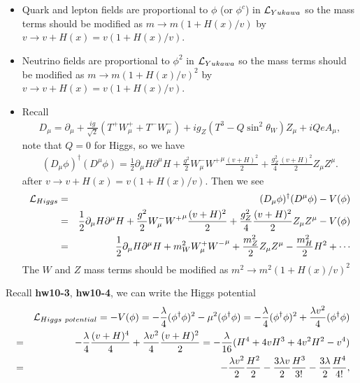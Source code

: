 \documentclass[11pt]{article}
\def\del{{\partial}}
\begin{document}
\section{ }
\begin{itemize}
    \item Quark and lepton fields are proportional to $\phi$ (or $\phi^c$) in ${\cal L}_{Yukawa}$ so the mass terms should be modified as $m\to m(1+H(x)/v)$ by $v \to v+H(x) = v(1+H(x)/v)$. 
    \item Neutrino fields are proportional to $\phi^2$ in ${\cal L}_{Yukawa}$ so the mass terms should be modified as $m\to m(1+H(x)/v)^2$ by $v \to v+H(x) = v(1+H(x)/v)$.
    \item Recall
    \begin{eqnarray}
        D_\mu = \del_\mu +\frac{ig}{\sqrt 2} (T^+ W_\mu^+ + T^-W_\mu^-)+ig_Z(T^3-Q\sin^2\theta_W)Z_\mu + iQeA_\mu,
    \end{eqnarray}
    note that $Q=0$ for Higgs, so we have
    \begin{eqnarray}
        (D_\mu \phi)^\dagger (D^\mu \phi) =  \frac{1}{ 2}\del_\mu H \del^\mu H + \frac{g^2}{2}W_\mu^-{W^+}^\mu \frac{(v+H)^2}{2}+\frac{g_Z^2}{4} \frac{(v+H)^2}{2} Z_\mu Z^\mu. 
    \end{eqnarray}
    after $v \to v+H(x) = v(1+H(x)/v)$.
    Then we see 
    \begin{eqnarray}
        {\cal L}_{Higgs} &=& (D_\mu \phi)^\dagger (D^\mu \phi) - V(\phi) \\ 
        &=& \frac{1}{2}\del_\mu H \del^\mu H + \frac{g^2}{2}W_\mu^-{W^+}^\mu \frac{(v+H)^2}{2}+\frac{g_Z^2}{4} \frac{(v+H)^2}{2} Z_\mu Z^\mu -V(\phi) \\
        &=& \frac{1}{2} \del_\mu H \del^\mu H+
        m_W^2 W^+_\mu {W^-}^\mu
        + \frac{m_Z^2}{2} Z_\mu Z^\mu -\frac{m_H^2}{2} H^2
        + \cdots 
    \end{eqnarray}
    The $W$ and $Z$ mass terms should be modified as $m^2\to m^2(1+H(x)/v)^2$
\end{itemize}
Recall {\bf hw10-3}, {\bf hw10-4}, we can write the Higgs potential
\begin{eqnarray}
    &&{\cal L}_{Higgs~potential}=-V(\phi) =-\frac{\lambda}{4} (\phi^\dagger \phi)^2 - \mu^2 (\phi^\dagger \phi) 
    =-\frac{\lambda}{4} (\phi^\dagger \phi)^2 + \frac{\lambda v^2}{4}(\phi^\dagger \phi) \\
    &=& -\frac{\lambda}{4} \frac{(v+H)^4}{4} +\frac{\lambda v^2}{4}\frac{(v+H)^2}{2} 
    = -\frac{\lambda}{16}(H^4+4vH^3+4v^2H^2-v^4) \\
    &=&  -\frac{\lambda v^2}{2}  \frac{H^2}{2}
    -\frac{3 \lambda v}{2}   \frac{H^3}{3!}
    -\frac{3 \lambda }{2}   \frac{H^4}{4!},
\end{eqnarray}
\end{document}
